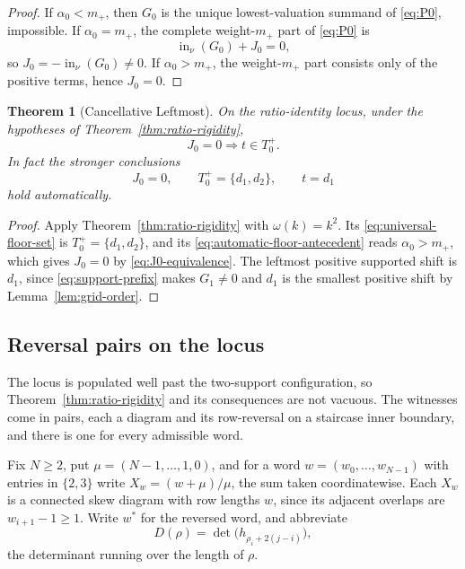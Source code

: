 \documentclass[11pt,a4paper]{amsart}
\numberwithin{equation}{section}
\theoremstyle{plain}
\newtheorem{theorem}{Theorem}[section]
\theoremstyle{definition}
\newcommand{\wt}{\nu}
\newcommand{\inin}{\operatorname{in}}
\begin{document}
\begin{proof}
If \(\alpha_0<m_+\), then \(G_0\) is the unique lowest-valuation summand of \eqref{eq:P0}, impossible.  If \(\alpha_0=m_+\), the complete weight-\(m_+\) part of \eqref{eq:P0} is
\[
\inin_{\wt}(G_0)+J_0=0,
\]
so \(J_0=-\inin_{\wt}(G_0)\ne0\).  If \(\alpha_0>m_+\), the weight-\(m_+\) part consists only of the positive terms, hence \(J_0=0\).
\end{proof}

\begin{theorem}[Cancellative Leftmost]\label{thm:floor}
On the ratio-identity locus, under the hypotheses of Theorem~\ref{thm:ratio-rigidity},
\begin{equation}\label{eq:floor}
J_0=0\Longrightarrow t\in T_0^+.
\end{equation}
In fact the stronger conclusions
\begin{equation}\label{eq:floor-strong}
J_0=0,\qquad T_0^+=\{d_1,d_2\},\qquad t=d_1
\end{equation}
hold automatically.
\end{theorem}

\begin{proof}
Apply Theorem~\ref{thm:ratio-rigidity} with \(\omega(k)=k^2\).  Its
\eqref{eq:universal-floor-set} is \(T_0^+=\{d_1,d_2\}\), and its
\eqref{eq:automatic-floor-antecedent} reads \(\alpha_0>m_+\), which gives
\(J_0=0\) by \eqref{eq:J0-equivalence}.  The leftmost positive supported
shift is \(d_1\), since \eqref{eq:support-prefix} makes \(G_1\ne0\) and
\(d_1\) is the smallest positive shift by Lemma~\ref{lem:grid-order}.
\end{proof}

\subsection{Reversal pairs on the locus}\label{subsec:locus-family}

The locus is populated well past the two-support configuration, so
Theorem~\ref{thm:ratio-rigidity} and its consequences are not vacuous.  The
witnesses come in pairs, each a diagram and its row-reversal on a staircase
inner boundary, and there is one for every admissible word.

Fix \(N\ge2\), put \(\mu=(N-1,\ldots,1,0)\), and for a word
\(w=(w_0,\ldots,w_{N-1})\) with entries in \(\{2,3\}\) write
\(X_w=(w+\mu)/\mu\), the sum taken coordinatewise.  Each \(X_w\) is a connected
skew diagram with row lengths \(w\), since its adjacent overlaps are
\(w_{i+1}-1\ge1\).  Write \(w^{*}\) for the reversed word, and abbreviate
\[
D(\rho)=\det\bigl(h_{\rho_i+2(j-i)}\bigr),
\]
the determinant running over the length of \(\rho\).
\end{document}
